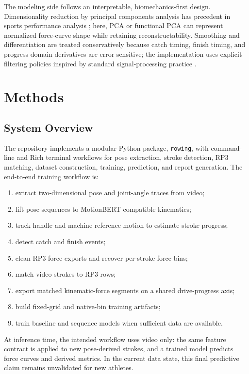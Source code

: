 \documentclass[11pt]{article}
\begin{document}
The modeling side follows an interpretable, biomechanics-first design. Dimensionality reduction by principal components analysis has precedent in sports performance analysis \citep{odono2008pca}; here, PCA or functional PCA can represent normalized force-curve shape while retaining reconstructability. Smoothing and differentiation are treated conservatively because catch timing, finish timing, and progress-domain derivatives are error-sensitive; the implementation uses explicit filtering policies inspired by standard signal-processing practice \citep{savitzky1964smoothing,butterworth1930filter}.

\section{Methods}
\subsection{System Overview}
The repository implements a modular Python package, \texttt{rowing}, with command-line and Rich terminal workflows for pose extraction, stroke detection, RP3 matching, dataset construction, training, prediction, and report generation. The end-to-end training workflow is:
\begin{enumerate}
  \item extract two-dimensional pose and joint-angle traces from video;
  \item lift pose sequences to MotionBERT-compatible kinematics;
  \item track handle and machine-reference motion to estimate stroke progress;
  \item detect catch and finish events;
  \item clean RP3 force exports and recover per-stroke force bins;
  \item match video strokes to RP3 rows;
  \item export matched kinematic-force segments on a shared drive-progress axis;
  \item build fixed-grid and native-bin training artifacts;
  \item train baseline and sequence models when sufficient data are available.
\end{enumerate}
At inference time, the intended workflow uses video only: the same feature contract is applied to new pose-derived strokes, and a trained model predicts force curves and derived metrics. In the current data state, this final predictive claim remains unvalidated for new athletes.
\end{document}

